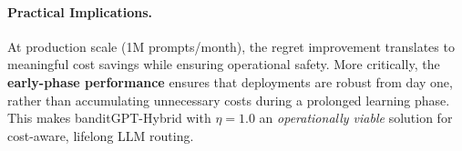 \begin{table}[t]
\paragraph{Practical Implications.}
At production scale (1M prompts/month), the regret improvement translates to meaningful cost savings while ensuring operational safety. More critically, the \textbf{early-phase performance} ensures that deployments are robust from day one, rather than accumulating unnecessary costs during a prolonged learning phase. This makes banditGPT-Hybrid with $\eta=1.0$ an \emph{operationally viable} solution for cost-aware, lifelong LLM routing.

\end{table}
